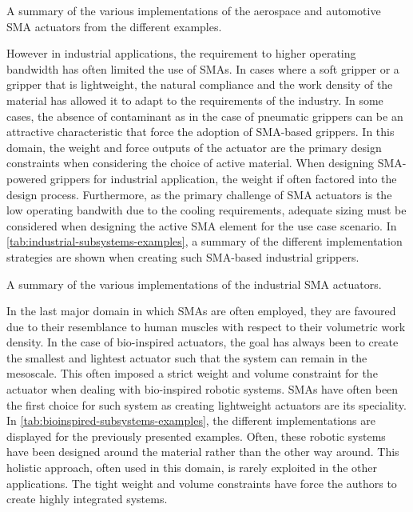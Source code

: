 \begin{table}[hbt]
    \centering
    \caption{A summary of the various implementations of the aerospace and automotive SMA actuators from the different examples.}
    
    \label{tab:auto-subsystems-examples}
\end{table}

However in industrial applications, the requirement to higher operating bandwidth has often limited the use of SMAs. In cases where a soft gripper or a gripper that is lightweight, the natural compliance and the work density of the material has allowed it to adapt to the requirements of the industry. In some cases, the absence of contaminant as in the case of pneumatic grippers can be an attractive characteristic that force the adoption of SMA-based grippers. In this domain, the weight and force outputs of the actuator are the primary design constraints when considering the choice of active material. When designing SMA-powered grippers for industrial application, the weight if often factored into the design process. Furthermore, as the primary challenge of SMA actuators is the low operating bandwith due to the cooling requirements, adequate sizing must be considered when designing the active SMA element for the use case scenario. In \cref{tab:industrial-subsystems-examples}, a summary of the different implementation strategies are shown when creating such SMA-based industrial grippers.

\begin{table}[hbt]
    \centering
    \caption{A summary of the various implementations of the industrial SMA actuators.}
    
    \label{tab:industrial-subsystems-examples}
\end{table}

In the last major domain in which SMAs are often employed, they are favoured due to their resemblance to human muscles with respect to their volumetric work density. In the case of bio-inspired actuators, the goal has always been to create the smallest and lightest actuator such that the system can remain in the mesoscale. This often imposed a strict weight and volume constraint for the actuator when dealing with bio-inspired robotic systems. SMAs have often been the first choice for such system as creating lightweight actuators are its speciality. In \cref{tab:bioinspired-subsystems-examples}, the different implementations are displayed for the previously presented examples. Often, these robotic systems have been designed around the material rather than the other way around. This holistic approach, often used in this domain, is rarely exploited in the other applications. The tight weight and volume constraints have force the authors to create highly integrated systems.


